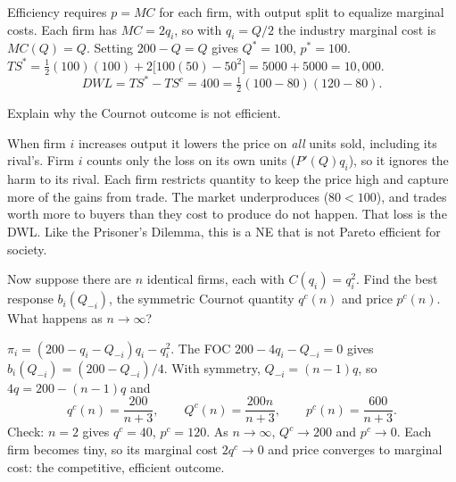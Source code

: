 \begin{description}
\begin{solution}
Efficiency requires $p=MC$ for each firm, with output split to equalize marginal costs. Each firm has $MC=2q_i$, so with $q_i=Q/2$ the industry marginal cost is $MC(Q)=Q$. Setting $200-Q=Q$ gives $Q^*=100$, $p^*=100$.
$TS^*=\tfrac12(100)(100)+2\big[100(50)-50^2\big]=5000+5000=10{,}000$.
\[DWL=TS^*-TS^c=400=\tfrac12(100-80)(120-80).\]
\begin{center}
\end{center}
\end{solution}
\item[4.6] Explain why the Cournot outcome is not efficient.
\begin{solution}
When firm $i$ increases output it lowers the price on \emph{all} units sold, including its rival's. Firm $i$ counts only the loss on its own units ($P'(Q)q_i$), so it ignores the harm to its rival. Each firm restricts quantity to keep the price high and capture more of the gains from trade. The market underproduces ($80<100$), and trades worth more to buyers than they cost to produce do not happen. That loss is the DWL. Like the Prisoner's Dilemma, this is a NE that is not Pareto efficient for society.
\end{solution}
\item[4.7] Now suppose there are $n$ identical firms, each with $C(q_i)=q_i^2$. Find the best response $b_i(Q_{-i})$, the symmetric Cournot quantity $q^c(n)$ and price $p^c(n)$. What happens as $n\to\infty$?
\begin{solution}
$\pi_i=(200-q_i-Q_{-i})q_i-q_i^2$. The FOC $200-4q_i-Q_{-i}=0$ gives $b_i(Q_{-i})=(200-Q_{-i})/4$. With symmetry, $Q_{-i}=(n-1)q$, so $4q=200-(n-1)q$ and
\[q^c(n)=\frac{200}{n+3},\qquad Q^c(n)=\frac{200n}{n+3},\qquad p^c(n)=\frac{600}{n+3}.\]
Check: $n=2$ gives $q^c=40$, $p^c=120$. As $n\to\infty$, $Q^c\to200$ and $p^c\to0$. Each firm becomes tiny, so its marginal cost $2q^c\to0$ and price converges to marginal cost: the competitive, efficient outcome.
\end{solution}
\end{description}


